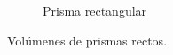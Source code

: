 \begin{figure}[H]
\begin{subfigure}{.25\textwidth}
        \caption{Prisma rectangular}
        \label{sfig:20230319051039}
    \end{subfigure}
    \caption{Volúmenes de prismas rectos.}
    \label{fig:vol_pris01}
\end{figure}



